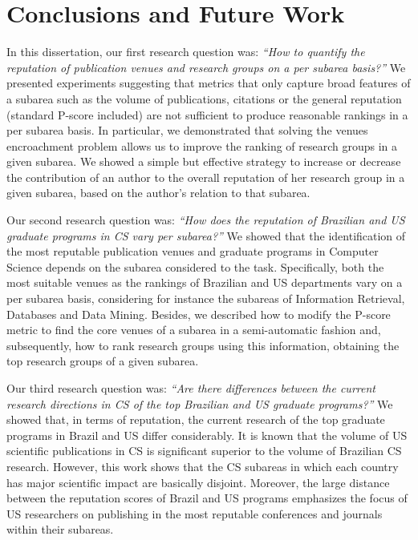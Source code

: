 \documentclass[msc]{ppgccufmg}
\begin{document}


\chapter{Conclusions and Future Work}\label{sec:conclusions}

In this dissertation, our first research question was: \textit{``How to quantify the reputation of publication venues and research groups on a per subarea basis?''} We presented experiments suggesting that metrics that only capture broad features of a subarea such as the volume of publications, citations or the general reputation (standard P-score included) are not sufficient to produce reasonable rankings in a per subarea basis. In particular, we demonstrated that solving the venues encroachment problem allows us to improve the ranking of research groups in a given subarea. We showed a simple but effective strategy to increase or decrease the contribution of an author to the overall reputation of her research group in a given subarea, based on the author's relation to that subarea. 

Our second research question was: \textit{``How does the reputation of Brazilian and US graduate programs in CS vary per subarea?''} We showed that the identification of the most reputable publication venues and graduate programs in Computer Science depends on the subarea considered to the task. Specifically, both the most suitable venues as the rankings of Brazilian and US departments vary on a per subarea basis, considering for instance the subareas of Information Retrieval, Databases and Data Mining. Besides, we described how to modify the P-score metric to find the core venues of a subarea in a semi-automatic fashion and, subsequently, how to rank research groups using this information, obtaining the top research groups of a given subarea.

Our third research question was: \textit{``Are there differences between the current research directions in CS of the top Brazilian and US graduate programs?''} We showed that, in terms of reputation, the current research of the top graduate programs in Brazil and US differ considerably. It is known that the volume of US scientific publications in CS is significant superior to the volume of Brazilian CS research. However, this work shows that the CS subareas in which each country has major scientific impact are basically disjoint. 
Moreover, the large distance between the reputation scores of Brazil and US programs emphasizes the focus of US researchers on publishing in the most reputable conferences and journals within their subareas. 
\end{document}

